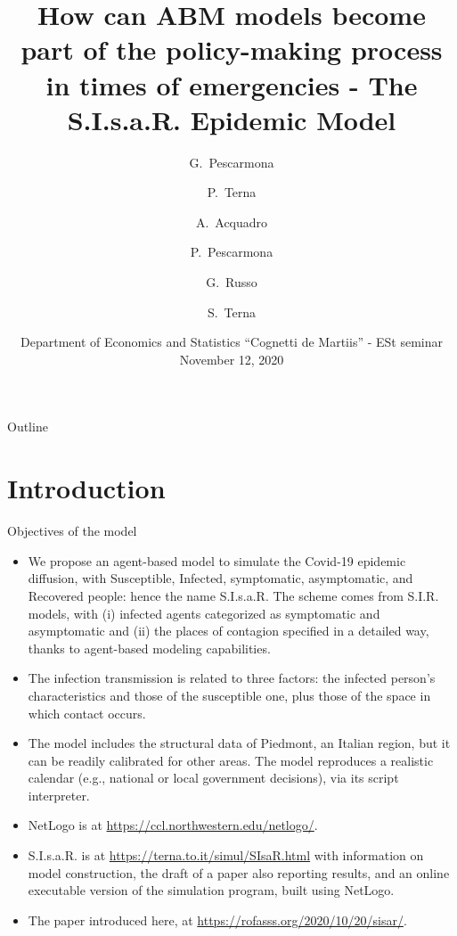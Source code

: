 \documentclass[8pt]{beamer}
\title[S.I.s.a.R. Epidemic Model] %
{How can ABM models become part of the policy-making process in times of emergencies - The S.I.s.a.R. Epidemic Model}
\author[] %
{G.~Pescarmona\inst{1} \and P.~Terna\inst{2} \and A.~Acquadro\inst{1} \and P.~Pescarmona\inst{3} \and G.~Russo\inst{4}  
\and S.~Terna\inst{5}  }
\institute[] %
{
  \inst{1}%
 University of Torino, Italy
  \and
  \inst{2}%
  University of Torino, Italy, retired \& Fondazione Collegio Carlo Alberto, Italy
 \and
  \inst{3}%
  University of Groningen, The Netherlands  
  \and
  \inst{4}%
  Centro Einaudi, Torino, Italy
  \and
  \inst{5}%
 tomorrowdata.io
  }
\date[] %
{Department of Economics and Statistics ``Cognetti de Martiis'' -  ESt seminar\\November 12, 2020}
\begin{document}
\begin{frame}
  \titlepage
\end{frame}

\begin{frame}{Outline}
  \tableofcontents
\end{frame}

\section{Introduction}

\begin{frame}{Objectives of the model}

  \begin{itemize}
  \item
We propose an agent-based model to simulate the Covid-19 epidemic diffusion, with Susceptible, Infected, symptomatic, asymptomatic, and Recovered people: hence the name S.I.s.a.R. The scheme comes from S.I.R. models, with (i) infected agents categorized as symptomatic and asymptomatic and (ii) the places of contagion specified in a detailed way, thanks to agent-based modeling capabilities. 

 \item
The infection transmission is related to three factors: the infected person's characteristics and those of the susceptible one, plus those of the space in which contact occurs.

 \item
The model includes the structural data of Piedmont, an Italian region, but it can be readily calibrated for other areas. The model reproduces a realistic calendar (e.g., national or local government decisions), via its script interpreter.  

\item NetLogo is at \url{https://ccl.northwestern.edu/netlogo/}.

 \item
 
S.I.s.a.R. is at \url{https://terna.to.it/simul/SIsaR.html} with information on model construction, the draft of a paper also reporting results, and an online executable version of the simulation program, built using NetLogo.

 \item
 The paper introduced here, at \url{https://rofasss.org/2020/10/20/sisar/}.

 \end{itemize}
\end{frame}
\end{document}
